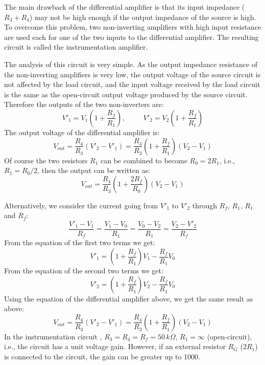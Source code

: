 \begin{itemize}

  The main drawback of the differential amplifier is that its input 
  impedance ($R_3+R_4$) may not be high enough if the output impedance 
  of the source is high. To overcome this problem, two non-inverting
  amplifiers with high input resistance are used each for one of the
  two inputs to the differential amplifier. The resulting circuit is 
  called the instrumentation amplifier.


  The analysis of this circuit is very simple. As the output impedance
  resistance of the non-inverting amplifiers is very low, the output 
  voltage of the source circuit is not affected by the load circuit, 
  and the input voltage received by the load circuit is the same as 
  the open-circuit output voltage produced by the source circuit. 
  Therefore the outputs of the two non-inverters are:
  \[
  V'_1=V_1\left(1+\frac{R_f}{R_1}\right),\;\;\;\;\;\;\;\;\;
  V'_2=V_2\left(1+\frac{R_f}{R_1}\right) 
  \]
  The output voltage of the differential amplifier is:
  \[ 
  V_{out}=\frac{R_4}{R_3}(V'_2-V'_1)
  =\frac{R_4}{R_3}\left(1+\frac{R_f}{R_1}\right)(V_2-V_1) 
  \]
  Of course the two resistors $R_1$ can be combined to become $R_0=2R_1$,
  i.e., $R_1=R_0/2$, then the output can be written as:
  \[
  V_{out}=\frac{R_4}{R_3}\left(1+\frac{2R_f}{R_0}\right)(V_2-V_1) 
  \]

  Alternatively, we consider the current going from $V'_1$ to $V'_2$
  through $R_f$, $R_1$, $R_1$ and $R_f$:
  \[
  \frac{V'_1-V_1}{R_f}=\frac{V_1-V_0}{R_1}=\frac{V_0-V_2}{R_1}
  =\frac{V_2-V'_2}{R_f} 
  \]
  From the equation of the first two terms we get:
  \[
  V'_1=\left(1+\frac{R_f}{R_1}\right)V_1-\frac{R_f}{R_1}V_0 
  \]
  From the equation of the second two terms we get:
  \[
  V'_2=\left(1+\frac{R_f}{R_1}\right)V_2-\frac{R_f}{R_1}V_0 
  \]
  Using the equation of the differential amplifier above, we get the
  same result as above:
  \[
  V_{out}=\frac{R_4}{R_3}(V'_2-V'_1)
  =\frac{R_4}{R_3}\left(1+\frac{R_f}{R_1}\right)(V_2-V_1) 
  \]
  In the instrumentation circuit 
  ,
  $R_3=R_4=R_f=50\,k\Omega$, $R_1=\infty$ (open-circuit), i.e., the 
  circuit has a unit voltage gain. However, if an external resistor 
  $R_G$ ($2R_1$) is connected to the circuit, the gain can be greater 
  up to 1000.
  



\end{itemize}
